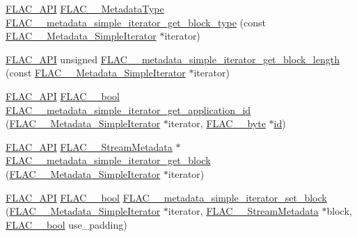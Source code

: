 \begin{DoxyCompactItemize}
\item 
\mbox{\hyperlink{group__flac__export_ga56ca07df8a23310707732b1c0007d6f5}{F\+L\+A\+C\+\_\+\+A\+PI}} \mbox{\hyperlink{group__flac__format_gac71714ba8ddbbd66d26bb78a427fac01}{F\+L\+A\+C\+\_\+\+\_\+\+Metadata\+Type}} \mbox{\hyperlink{group__flac__metadata__level1_ga4649a49d230ac8bfc3ec88f5196205bb}{F\+L\+A\+C\+\_\+\+\_\+metadata\+\_\+simple\+\_\+iterator\+\_\+get\+\_\+block\+\_\+type}} (const \mbox{\hyperlink{group__flac__metadata__level1_ga6accccddbb867dfc2eece9ee3ffecb3a}{F\+L\+A\+C\+\_\+\+\_\+\+Metadata\+\_\+\+Simple\+Iterator}} $\ast$iterator)
\item 
\mbox{\hyperlink{group__flac__export_ga56ca07df8a23310707732b1c0007d6f5}{F\+L\+A\+C\+\_\+\+A\+PI}} unsigned \mbox{\hyperlink{group__flac__metadata__level1_gaad69b5d6c58c48e08dcfb3f1018c2602}{F\+L\+A\+C\+\_\+\+\_\+metadata\+\_\+simple\+\_\+iterator\+\_\+get\+\_\+block\+\_\+length}} (const \mbox{\hyperlink{group__flac__metadata__level1_ga6accccddbb867dfc2eece9ee3ffecb3a}{F\+L\+A\+C\+\_\+\+\_\+\+Metadata\+\_\+\+Simple\+Iterator}} $\ast$iterator)
\item 
\mbox{\hyperlink{group__flac__export_ga56ca07df8a23310707732b1c0007d6f5}{F\+L\+A\+C\+\_\+\+A\+PI}} \mbox{\hyperlink{ordinals_8h_a95103469f1cbd78b8cf250194985b34e}{F\+L\+A\+C\+\_\+\+\_\+bool}} \mbox{\hyperlink{group__flac__metadata__level1_gaf2db2a96f7c60100d620a2eefb8360bc}{F\+L\+A\+C\+\_\+\+\_\+metadata\+\_\+simple\+\_\+iterator\+\_\+get\+\_\+application\+\_\+id}} (\mbox{\hyperlink{group__flac__metadata__level1_ga6accccddbb867dfc2eece9ee3ffecb3a}{F\+L\+A\+C\+\_\+\+\_\+\+Metadata\+\_\+\+Simple\+Iterator}} $\ast$iterator, \mbox{\hyperlink{ordinals_8h_a5eb569b12d5b047cdacada4d57924ee3}{F\+L\+A\+C\+\_\+\+\_\+byte}} $\ast$\mbox{\hyperlink{_s_d_l__opengl__glext_8h_a58c2a664503e14ffb8f21012aabff3e9}{id}})
\item 
\mbox{\hyperlink{group__flac__export_ga56ca07df8a23310707732b1c0007d6f5}{F\+L\+A\+C\+\_\+\+A\+PI}} \mbox{\hyperlink{struct_f_l_a_c_____stream_metadata}{F\+L\+A\+C\+\_\+\+\_\+\+Stream\+Metadata}} $\ast$ \mbox{\hyperlink{group__flac__metadata__level1_ga31c9e013b3bdc04866eee2271349fe60}{F\+L\+A\+C\+\_\+\+\_\+metadata\+\_\+simple\+\_\+iterator\+\_\+get\+\_\+block}} (\mbox{\hyperlink{group__flac__metadata__level1_ga6accccddbb867dfc2eece9ee3ffecb3a}{F\+L\+A\+C\+\_\+\+\_\+\+Metadata\+\_\+\+Simple\+Iterator}} $\ast$iterator)
\item 
\mbox{\hyperlink{group__flac__export_ga56ca07df8a23310707732b1c0007d6f5}{F\+L\+A\+C\+\_\+\+A\+PI}} \mbox{\hyperlink{ordinals_8h_a95103469f1cbd78b8cf250194985b34e}{F\+L\+A\+C\+\_\+\+\_\+bool}} \mbox{\hyperlink{group__flac__metadata__level1_ga7d1ceb2db292c968ae6ac18ecb15c356}{F\+L\+A\+C\+\_\+\+\_\+metadata\+\_\+simple\+\_\+iterator\+\_\+set\+\_\+block}} (\mbox{\hyperlink{group__flac__metadata__level1_ga6accccddbb867dfc2eece9ee3ffecb3a}{F\+L\+A\+C\+\_\+\+\_\+\+Metadata\+\_\+\+Simple\+Iterator}} $\ast$iterator, \mbox{\hyperlink{struct_f_l_a_c_____stream_metadata}{F\+L\+A\+C\+\_\+\+\_\+\+Stream\+Metadata}} $\ast$block, \mbox{\hyperlink{ordinals_8h_a95103469f1cbd78b8cf250194985b34e}{F\+L\+A\+C\+\_\+\+\_\+bool}} use\+\_\+padding)

\end{DoxyCompactItemize}
